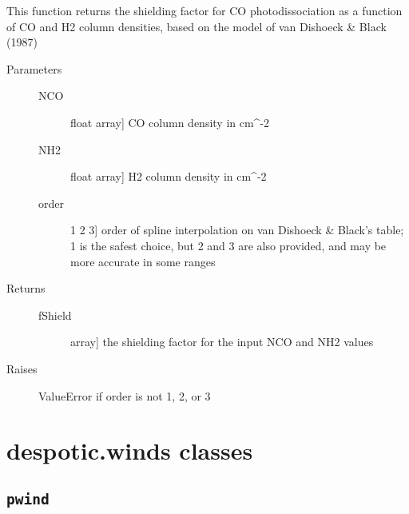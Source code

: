 \documentclass[letterpaper,10pt,english]{sphinxmanual}
\begin{document}
\begin{fulllineitems}
\label{fulldoc:despotic.chemistry.shielding.fShield_CO_vDB}
This function returns the shielding factor for CO
photodissociation as a function of CO and H2 column densities,
based on the model of van Dishoeck \& Black (1987)
\begin{description}
\item[{Parameters}] \leavevmode\begin{description}
\item[{NCO}] \leavevmode{[}float \textbar{} array{]}
CO column density in cm\textasciicircum{}-2

\item[{NH2}] \leavevmode{[}float \textbar{} array{]}
H2 column density in cm\textasciicircum{}-2

\item[{order}] \leavevmode{[}1 \textbar{} 2 \textbar{} 3{]}
order of spline interpolation on van Dishoeck \& Black's table;
1 is the safest choice, but 2 and 3 are also provided, and may
be more accurate in some ranges

\end{description}

\item[{Returns}] \leavevmode\begin{description}
\item[{fShield}] \leavevmode{[}array{]}
the shielding factor for the input NCO and NH2 values

\end{description}

\item[{Raises}] \leavevmode
ValueError if order is not 1, 2, or 3

\end{description}

\end{fulllineitems}



\section{despotic.winds classes}
\label{fulldoc:despotic-winds-classes}

\subsection{\texttt{pwind}}
\label{fulldoc:sssec-full-pwind}\label{fulldoc:pwind}
\end{document}
